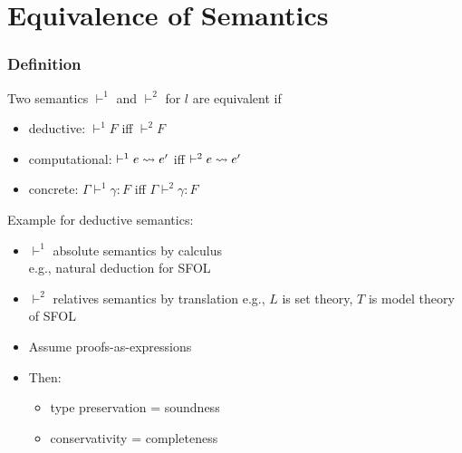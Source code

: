 \section{Equivalence of Semantics}

\begin{frame}\frametitle{Definition}
Two semantics $\vdash^1$ and $\vdash^2$ for $l$ are equivalent if
\begin{itemize}
\item deductive: $\vdash^1 F$ iff $\vdash^2 F$
\item computational: $\vdash^1 e\rightsquigarrow e'$ iff $\vdash^2 e\rightsquigarrow e'$
\item concrete: $\Gamma\vdash^1 \gamma:F$ iff $\Gamma\vdash^2 \gamma:F$
\end{itemize}

Example for deductive semantics:
\begin{itemize}
\item $\vdash^1$ absolute semantics by calculus \\
 e.g., natural deduction for SFOL
\item $\vdash^2$ relatives semantics by translation
 e.g., $L$ is set theory, $T$ is model theory of SFOL
\item Assume proofs-as-expressions
\item Then:
 \begin{itemize}
 \item type preservation = soundness
 \item conservativity = completeness
 \end{itemize}
\end{itemize}
\end{frame}


